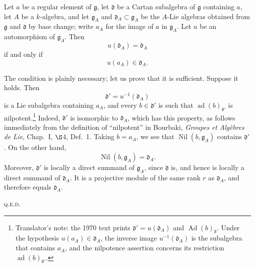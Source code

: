 \begin{corollary}
Let \(a\) be a regular element of \(\mathfrak g\), let
\(\mathfrak d\) be a Cartan subalgebra of \(\mathfrak g\) containing
\(a\), let \(A\) be a \(k\)-algebra, and let
\(\mathfrak g_A\) and \(\mathfrak d_A\subset\mathfrak g_A\) be the
\(A\)-Lie algebras obtained from \(\mathfrak g\) and \(\mathfrak d\)
by base change; write \(a_A\) for the image of \(a\) in
\(\mathfrak g_A\). Let \(u\) be an automorphism of
\(\mathfrak g_A\). Then
\[
  u(\mathfrak d_A)=\mathfrak d_A
\]
if and only if
\[
  u(a_A)\in\mathfrak d_A.
\]
\end{corollary}

The condition is plainly necessary; let us prove that it is
sufficient. Suppose it holds. Then
\[
  \mathfrak d'=u^{-1}(\mathfrak d_A)
\]
is a Lie subalgebra containing \(a_A\), and every \(b\in\mathfrak d'\)
is such that \(\operatorname{ad}(b)_{\mathfrak d'}\) is
nilpotent.\footnote{Translator's note: the 1970 text prints
\(\mathfrak d'=u(\mathfrak d_A)\) and
\(\operatorname{Ad}(b)_{\mathfrak d}\). Under the hypothesis
\(u(a_A)\in\mathfrak d_A\), the inverse image
\(u^{-1}(\mathfrak d_A)\) is the subalgebra that contains \(a_A\),
and the nilpotence assertion concerns its restriction
\(\operatorname{ad}(b)_{\mathfrak d'}\).}
Indeed, \(\mathfrak d'\) is isomorphic to \(\mathfrak d_A\), which
has this property, as follows immediately from the definition of
``nilpotent'' in Bourbaki, \emph{Groupes et Algèbres de Lie},
Chap.~I, \(\S\)4, Def.~1. Taking \(b=a_A\), we see that
\(\operatorname{Nil}(b,\mathfrak g_A)\) contains \(\mathfrak d'\).
On the other hand,
\[
  \operatorname{Nil}(b,\mathfrak g_A)=\mathfrak d_A.
\]
Moreover, \(\mathfrak d'\) is locally a direct summand of
\(\mathfrak g_A\), since \(\mathfrak d\) is, and hence is locally a
direct summand of \(\mathfrak d_A\). It is a projective module of the
same rank \(r\) as \(\mathfrak d_A\), and therefore equals
\(\mathfrak d_A\).
\par\hfill\textsc{q.e.d.}

